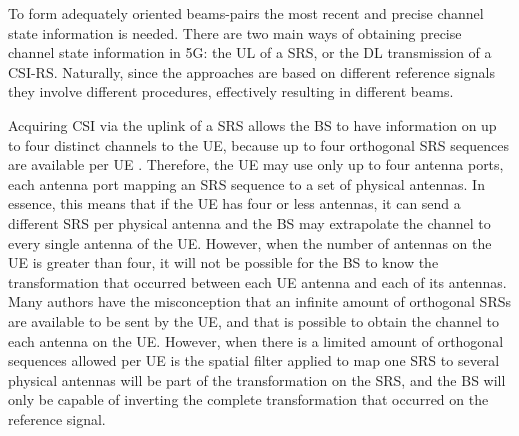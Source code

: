 

To form adequately oriented beams-pairs the most recent and precise channel state information is needed. There are two main ways of obtaining precise channel state information in 5G: the UL of a SRS, or the DL transmission of a CSI-RS. Naturally, since the approaches are based on different reference signals they involve different procedures, effectively resulting in different beams.




Acquiring CSI via the uplink of a \ac{SRS} allows the BS to have information on up to four distinct channels to the UE, because up to four orthogonal SRS sequences are available per UE \cite{DAHLMAN2018}. Therefore, the UE may use only up to four antenna ports, each antenna port mapping an SRS sequence to a set of physical antennas. In essence, this means that if the UE has four or less antennas, it can send a different SRS per physical antenna and the BS may extrapolate the channel to every single antenna of the UE. However, when the number of antennas on the UE is greater than four, it will not be possible for the BS to know the transformation that occurred between each UE antenna and each of its antennas. Many authors \cite{7504159}  have the misconception that an infinite amount of orthogonal SRSs are available to be sent by the UE, and that is possible to obtain the channel to each antenna on the UE. However, when there is a limited amount of orthogonal sequences allowed per UE is the spatial filter applied to map one SRS to several physical antennas will be part of the transformation on the SRS, and the BS will only be capable of inverting the complete transformation that occurred on the reference signal. 

